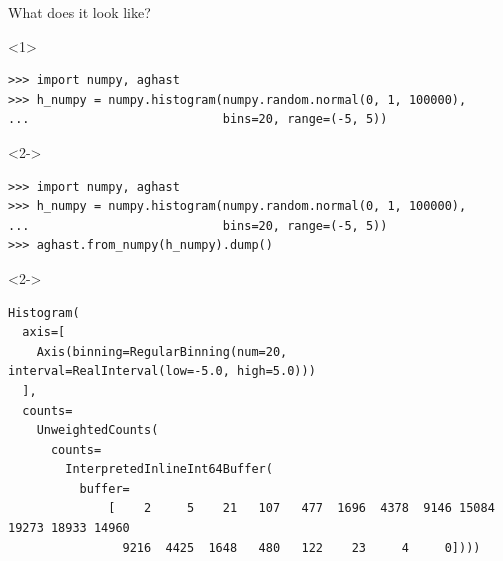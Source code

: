 \documentclass[aspectratio=169]{beamer}
\begin{document}
\begin{frame}[fragile]{What does it look like?}
\small
\begin{onlyenv}<1>
\begin{verbatim}
>>> import numpy, aghast
>>> h_numpy = numpy.histogram(numpy.random.normal(0, 1, 100000),
...                           bins=20, range=(-5, 5))

\end{verbatim}
\end{onlyenv}
\begin{onlyenv}<2->
\begin{verbatim}
>>> import numpy, aghast
>>> h_numpy = numpy.histogram(numpy.random.normal(0, 1, 100000),
...                           bins=20, range=(-5, 5))
>>> aghast.from_numpy(h_numpy).dump()
\end{verbatim}
\end{onlyenv}

\scriptsize
\begin{uncoverenv}<2->
\begin{verbatim}
Histogram(
  axis=[
    Axis(binning=RegularBinning(num=20, interval=RealInterval(low=-5.0, high=5.0)))
  ],
  counts=
    UnweightedCounts(
      counts=
        InterpretedInlineInt64Buffer(
          buffer=
              [    2     5    21   107   477  1696  4378  9146 15084 19273 18933 14960
                9216  4425  1648   480   122    23     4     0])))
\end{verbatim}
\end{uncoverenv}

\vspace{0.25 cm}
\end{frame}
\end{document}
